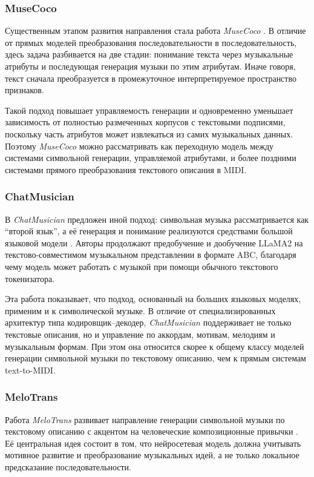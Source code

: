 \documentclass[a4paper,12pt]{extarticle}
\begin{document}
\subsubsection{MuseCoco}

Существенным этапом развития направления стала работа \textit{MuseCoco}
\cite{lu2023musecoco}. В отличие от прямых моделей преобразования
последовательности в последовательность, здесь задача разбивается на две
стадии: понимание текста через музыкальные атрибуты и последующая
генерация музыки по этим атрибутам. Иначе говоря, текст сначала
преобразуется в промежуточное интерпретируемое пространство признаков.

Такой подход повышает управляемость генерации и одновременно уменьшает
зависимость от полностью размеченных корпусов с текстовыми подписями,
поскольку часть атрибутов может извлекаться из самих музыкальных данных.
Поэтому \textit{MuseCoco} можно рассматривать как переходную модель
между системами символьной генерации, управляемой атрибутами, и более
поздними системами прямого преобразования текстового описания в MIDI.

\subsubsection{ChatMusician}

В \textit{ChatMusician} предложен иной подход: символьная музыка
рассматривается как ``второй язык'', а её генерация и понимание
реализуются средствами большой языковой модели
\cite{yuan2024chatmusician}. Авторы продолжают предобучение и
дообучение LLaMA2 на текстово-совместимом музыкальном представлении в
формате ABC, благодаря чему модель может работать с музыкой при помощи
обычного текстового токенизатора.

Эта работа показывает, что подход, основанный на больших языковых
моделях, применим и к символической музыке. В отличие от
специализированных архитектур типа кодировщик--декодер,
\textit{ChatMusician} поддерживает не только текстовые описания, но и
управление по аккордам, мотивам, мелодиям и музыкальным формам. При
этом она относится скорее к общему классу моделей генерации символьной
музыки по текстовому описанию, чем к прямым системам text-to-MIDI.

\subsubsection{MeloTrans}

Работа \textit{MeloTrans} развивает направление генерации символьной
музыки по текстовому описанию с акцентом на человеческие композиционные
привычки \cite{wang2024melotrans}. Её центральная идея состоит в том,
что нейросетевая модель должна учитывать мотивное развитие и
преобразование музыкальных идей, а не только локальное предсказание
последовательности.
\end{document}

